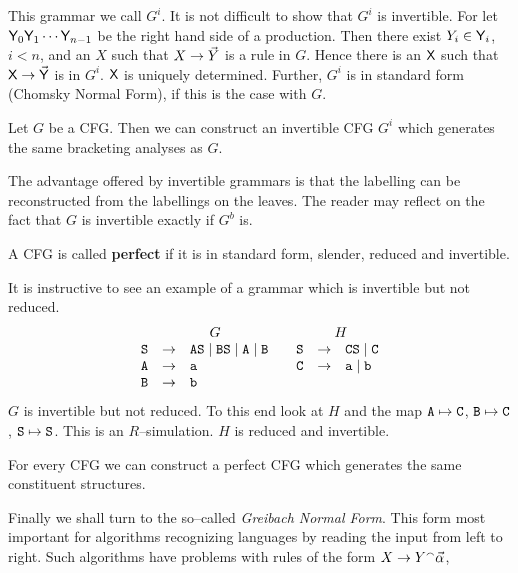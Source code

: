 This grammar we call $G^i$. It is not difficult to show
that $G^i$ is invertible.  For let $\textsf{Y}_0 \textsf{Y}_1 \dotsb \textsf{Y}_{n-1}$
be the right hand side of a production. Then there exist
$Y_i \in \textsf{Y}_i$, $i < n$, and an $X$ such that $X \rightarrow \vec{Y}$
is a rule in $G$. Hence there is an $\textsf{X}$ such that $\textsf{X} \rightarrow \vec{\textsf{Y}}$
is in $G^i$. $\textsf{X}$ is uniquely determined. Further, $G^i$ is
in standard form (Chomsky  Normal Form), if this is the case
with $G$.
\begin{thm}
\label{thm:invertierbar}
Let $G$ be a CFG. Then we can construct an
invertible CFG $G^i$ which generates the same
bracketing analyses as $G$.
\proofend
\end{thm}
The advantage offered by invertible grammars is that the labelling
can be reconstructed from the labellings on the leaves. The reader
may reflect on the fact that $G$ is invertible exactly if
$G^b$ is.
\begin{defn}
A CFG is called \textbf{perfect} if it is in
standard form, slender, reduced and invertible.
\end{defn}
It is instructive to see an example of a grammar which is
invertible but not reduced.
\begin{equation}
\begin{array}{l@{\quad\pf\quad}l@{\qquad}l@{\quad\pf\quad}l}
\multicolumn{2}{c}{G} & \multicolumn{2}{c}{H} \\
\mbox{\tt S} & \mbox{\tt AS} \mid \mbox{\tt BS} \mid \mbox{\tt A}
    \mid \mbox{\tt B} & \mbox{\tt S} & \mbox{\tt CS} \mid
        \mbox{\tt C} \\
\mbox{\tt A} & \mbox{\tt a} & \mbox{\tt C} & \mbox{\tt a} \mid
    \mbox{\tt b} \\
\mbox{\tt B} & \mbox{\tt b} & \multicolumn{2}{c}{}
\end{array}
\end{equation}
$G$ is invertible but not reduced. To this end look at
$H$ and the map $\mbox{\tt A} \mapsto \mbox{\tt C}$, 
$\mbox{\tt B} \mapsto \mbox{\tt C}$, 
$\mbox{\tt S} \mapsto \mbox{\tt S}$.
This is an $R$--simulation. $H$ is reduced and
invertible.
\begin{thm}
For every CFG we can construct a perfect CFG which generates 
the same constituent structures.
\end{thm}
Finally we shall turn to the so--called {\it Greibach Normal Form}.
This form most important for algorithms recognizing languages by
reading the input from left to right. Such algorithms have
problems with rules of the form $X \rightarrow Y {^{\smallfrown}} \vec{\alpha}$,
